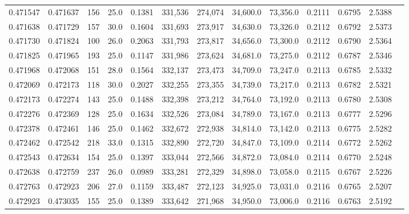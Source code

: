 \begin{tabular}{rrrrrrrrrrrrr}
0.471547 & 0.471637 &   156 & 25.0 &                                     0.1381 & 331,536 & 274,074 &  34,600.0 &  73,356.0 & 0.2111 & 0.6795 & 2.5388 \\
0.471638 & 0.471729 &   157 & 30.0 &                                     0.1604 & 331,693 & 273,917 &  34,630.0 &  73,326.0 & 0.2112 & 0.6792 & 2.5373 \\
0.471730 & 0.471824 &   100 & 26.0 &                                     0.2063 & 331,793 & 273,817 &  34,656.0 &  73,300.0 & 0.2112 & 0.6790 & 2.5364 \\
0.471825 & 0.471965 &   193 & 25.0 &                                     0.1147 & 331,986 & 273,624 &  34,681.0 &  73,275.0 & 0.2112 & 0.6787 & 2.5346 \\
0.471968 & 0.472068 &   151 & 28.0 &                                     0.1564 & 332,137 & 273,473 &  34,709.0 &  73,247.0 & 0.2113 & 0.6785 & 2.5332 \\
0.472069 & 0.472173 &   118 & 30.0 &                                     0.2027 & 332,255 & 273,355 &  34,739.0 &  73,217.0 & 0.2113 & 0.6782 & 2.5321 \\
0.472173 & 0.472274 &   143 & 25.0 &                                     0.1488 & 332,398 & 273,212 &  34,764.0 &  73,192.0 & 0.2113 & 0.6780 & 2.5308 \\
0.472276 & 0.472369 &   128 & 25.0 &                                     0.1634 & 332,526 & 273,084 &  34,789.0 &  73,167.0 & 0.2113 & 0.6777 & 2.5296 \\
0.472378 & 0.472461 &   146 & 25.0 &                                     0.1462 & 332,672 & 272,938 &  34,814.0 &  73,142.0 & 0.2113 & 0.6775 & 2.5282 \\
0.472462 & 0.472542 &   218 & 33.0 &                                     0.1315 & 332,890 & 272,720 &  34,847.0 &  73,109.0 & 0.2114 & 0.6772 & 2.5262 \\
0.472543 & 0.472634 &   154 & 25.0 &                                     0.1397 & 333,044 & 272,566 &  34,872.0 &  73,084.0 & 0.2114 & 0.6770 & 2.5248 \\
0.472638 & 0.472759 &   237 & 26.0 &                                     0.0989 & 333,281 & 272,329 &  34,898.0 &  73,058.0 & 0.2115 & 0.6767 & 2.5226 \\
0.472763 & 0.472923 &   206 & 27.0 &                                     0.1159 & 333,487 & 272,123 &  34,925.0 &  73,031.0 & 0.2116 & 0.6765 & 2.5207 \\
0.472923 & 0.473035 &   155 & 25.0 &                                     0.1389 & 333,642 & 271,968 &  34,950.0 &  73,006.0 & 0.2116 & 0.6763 & 2.5192 \\

\end{tabular}
